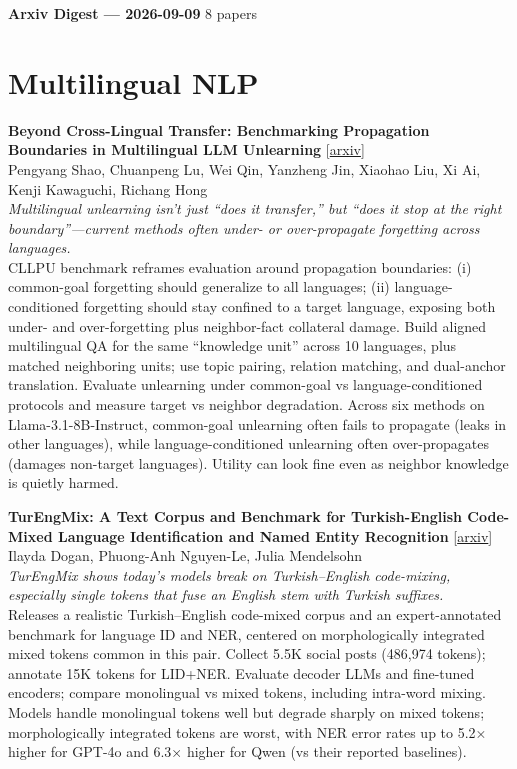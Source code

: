 \documentclass[12pt,letterpaper]{article}
\begin{document}
{\footnotesize\textbf{Arxiv Digest --- 2026-09-09} \hfill 8 papers}

\smallskip

\section*{Multilingual NLP}

{\small\textbf{Beyond Cross-Lingual Transfer: Benchmarking Propagation Boundaries in Multilingual LLM Unlearning}} {\scriptsize[\href{https://arxiv.org/abs/2609.05976}{arxiv}]}\\
{\scriptsize Pengyang Shao, Chuanpeng Lu, Wei Qin, Yanzheng Jin, Xiaohao Liu, Xi Ai, Kenji Kawaguchi, Richang Hong}\\

{\small\textit{Multilingual unlearning isn't just ``does it transfer,'' but ``does it stop at the right boundary''---current methods often under- or over-propagate forgetting across languages.}}\\[1pt]
{\footnotesize CLLPU benchmark reframes evaluation around propagation boundaries: (i) common-goal forgetting should generalize to all languages; (ii) language-conditioned forgetting should stay confined to a target language, exposing both under- and over-forgetting plus neighbor-fact collateral damage. Build aligned multilingual QA for the same ``knowledge unit'' across 10 languages, plus matched neighboring units; use topic pairing, relation matching, and dual-anchor translation. Evaluate unlearning under common-goal vs language-conditioned protocols and measure target vs neighbor degradation. Across six methods on Llama-3.1-8B-Instruct, common-goal unlearning often fails to propagate (leaks in other languages), while language-conditioned unlearning often over-propagates (damages non-target languages). Utility can look fine even as neighbor knowledge is quietly harmed.}

\medskip

{\small\textbf{TurEngMix: A Text Corpus and Benchmark for Turkish-English Code-Mixed Language Identification and Named Entity Recognition}} {\scriptsize[\href{https://arxiv.org/abs/2609.06963}{arxiv}]}\\
{\scriptsize Ilayda Dogan, Phuong-Anh Nguyen-Le, Julia Mendelsohn}\\

{\small\textit{TurEngMix shows today's models break on Turkish--English code-mixing, especially single tokens that fuse an English stem with Turkish suffixes.}}\\[1pt]
{\footnotesize Releases a realistic Turkish--English code-mixed corpus and an expert-annotated benchmark for language ID and NER, centered on morphologically integrated mixed tokens common in this pair. Collect 5.5K social posts (486,974 tokens); annotate 15K tokens for LID+NER. Evaluate decoder LLMs and fine-tuned encoders; compare monolingual vs mixed tokens, including intra-word mixing. Models handle monolingual tokens well but degrade sharply on mixed tokens; morphologically integrated tokens are worst, with NER error rates up to 5.2× higher for GPT-4o and 6.3× higher for Qwen (vs their reported baselines).}
\end{document}
